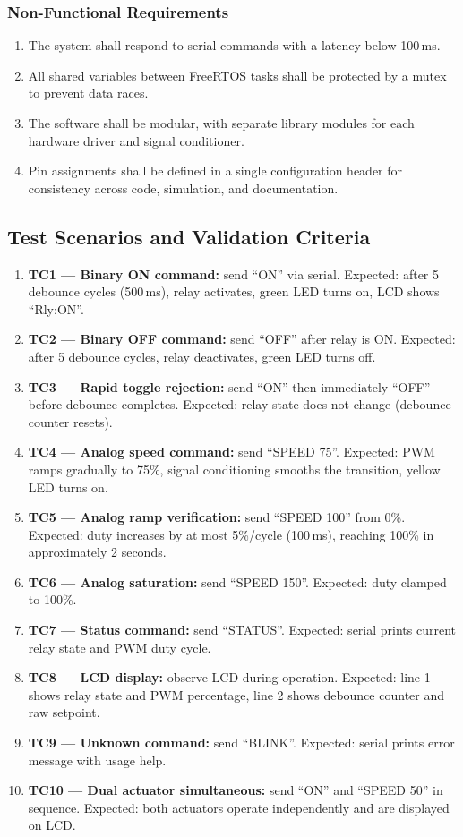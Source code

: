 \subsubsection{Non-Functional Requirements}

\begin{enumerate}
    \item[NFR1] The system shall respond to serial commands with a latency below 100\,ms.
    \item[NFR2] All shared variables between FreeRTOS tasks shall be protected by a mutex to prevent data races.
    \item[NFR3] The software shall be modular, with separate library modules for each hardware driver and signal conditioner.
    \item[NFR4] Pin assignments shall be defined in a single configuration header for consistency across code, simulation, and documentation.
\end{enumerate}

\subsection{Test Scenarios and Validation Criteria}

\begin{enumerate}
    \item \textbf{TC1 --- Binary ON command:} send ``ON'' via serial. Expected: after 5 debounce cycles (500\,ms), relay activates, green LED turns on, LCD shows ``Rly:ON''.
    \item \textbf{TC2 --- Binary OFF command:} send ``OFF'' after relay is ON. Expected: after 5 debounce cycles, relay deactivates, green LED turns off.
    \item \textbf{TC3 --- Rapid toggle rejection:} send ``ON'' then immediately ``OFF'' before debounce completes. Expected: relay state does not change (debounce counter resets).
    \item \textbf{TC4 --- Analog speed command:} send ``SPEED 75''. Expected: PWM ramps gradually to 75\%, signal conditioning smooths the transition, yellow LED turns on.
    \item \textbf{TC5 --- Analog ramp verification:} send ``SPEED 100'' from 0\%. Expected: duty increases by at most 5\%/cycle (100\,ms), reaching 100\% in approximately 2 seconds.
    \item \textbf{TC6 --- Analog saturation:} send ``SPEED 150''. Expected: duty clamped to 100\%.
    \item \textbf{TC7 --- Status command:} send ``STATUS''. Expected: serial prints current relay state and PWM duty cycle.
    \item \textbf{TC8 --- LCD display:} observe LCD during operation. Expected: line 1 shows relay state and PWM percentage, line 2 shows debounce counter and raw setpoint.
    \item \textbf{TC9 --- Unknown command:} send ``BLINK''. Expected: serial prints error message with usage help.
    \item \textbf{TC10 --- Dual actuator simultaneous:} send ``ON'' and ``SPEED 50'' in sequence. Expected: both actuators operate independently and are displayed on LCD.
\end{enumerate}

